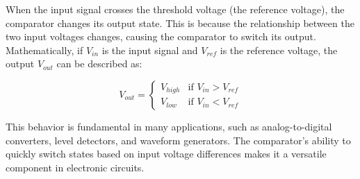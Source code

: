 When the input signal crosses the threshold voltage (the reference voltage), the comparator changes its output state. This is because the relationship between the two input voltages changes, causing the comparator to switch its output. Mathematically, if \( V_{in} \) is the input signal and \( V_{ref} \) is the reference voltage, the output \( V_{out} \) can be described as:

\[
V_{out} = 
\begin{cases}
V_{high} & \text{if } V_{in} > V_{ref} \\
V_{low} & \text{if } V_{in} < V_{ref}
\end{cases}
\]

This behavior is fundamental in many applications, such as analog-to-digital converters, level detectors, and waveform generators. The comparator's ability to quickly switch states based on input voltage differences makes it a versatile component in electronic circuits.

